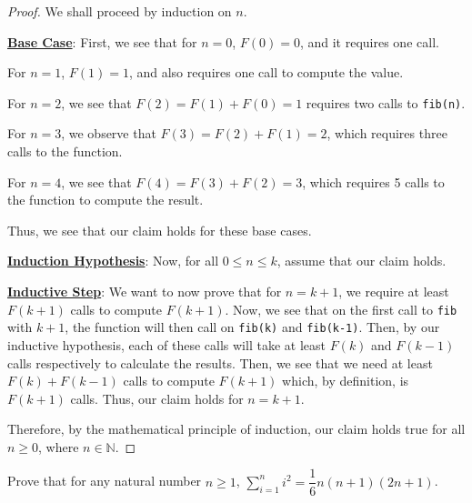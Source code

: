 \documentclass[openany]{book}
\newcommand{\NN}{\mathbb{N}}
\let\oldsum\sum
\renewcommand{\sum}[2]{\oldsum\limits_{#1}^{#2}}
\begin{document}
\begin{proof}
	We shall proceed by induction on $n$.
	
	\underline{\textbf{Base Case}}: First, we see that for $n=0$, $F(0)=0$, and it requires one call.
	
	For $n=1$, $F(1)=1$, and also requires one call to compute the value.
	
	For $n=2$, we see that $F(2)=F(1)+F(0)=1$ requires two calls to \lstinline[language=Python]|fib(n)|.
	
	For $n=3$, we observe that $F(3)=F(2)+F(1)=2$, which requires three calls to the function.
	
	For $n=4$, we see that $F(4)=F(3)+F(2)=3$, which requires 5 calls to the function to compute the result.
	
	Thus, we see that our claim holds for these base cases.
	
	\underline{\textbf{Induction Hypothesis}}: Now, for all $0 \leq n \leq k$, assume that our claim holds.
	
	\underline{\textbf{Inductive Step}}: We want to now prove that for $n=k+1$, we require at least $F(k+1)$ calls to compute $F(k+1)$. Now, we see that on the first call to \lstinline[language=Python]|fib| with $k+1$, the function will then call on \lstinline[language=Python]|fib(k)| and \lstinline[language==Python]|fib(k-1)|. Then, by our inductive hypothesis, each of these calls will take at least $F(k)$ and $F(k-1)$ calls respectively to calculate the results. Then, we see that we need at least $F(k)+F(k-1)$ calls to compute $F(k+1)$ which, by definition, is $F(k+1)$ calls. Thus, our claim holds for $n=k+1$.
	
	Therefore, by the mathematical principle of induction, our claim holds true for all $n \geq 0$, where $n \in \NN$.
\end{proof}
\begin{hw}
	Prove that for any natural number $n \geq 1$, $\sum{i=1}{n} i^{2}=\dfrac{1}{6}n(n+1)(2n+1)$.
\end{hw}
\end{document}
